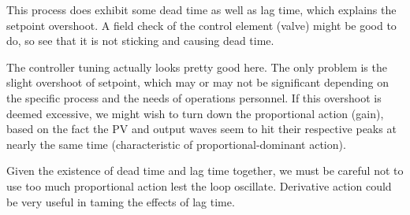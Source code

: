 \vskip 10pt

This process does exhibit some dead time as well as lag time, which explains the setpoint overshoot.  A field check of the control element (valve) might be good to do, so see that it is not sticking and causing dead time. 

\vskip 10pt
  
The controller tuning actually looks pretty good here.  The only problem is the slight overshoot of setpoint, which may or may not be significant depending on the specific process and the needs of operations personnel.  If this overshoot is deemed excessive, we might wish to turn down the proportional action (gain), based on the fact the PV and output waves seem to hit their respective peaks at nearly the same time (characteristic of proportional-dominant action).

\vskip 10pt

Given the existence of dead time and lag time together, we must be careful not to use too much proportional action lest the loop oscillate.  Derivative action could be very useful in taming the effects of lag time.











